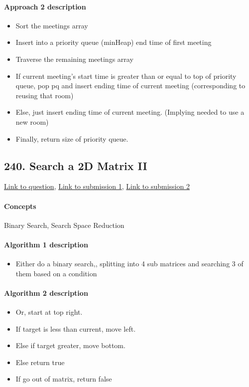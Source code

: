 \documentclass[11pt]{book}
\begin{document}
\paragraph{Approach 2 description}
\begin{itemize}
    \item Sort the meetings array
    \item Insert into a priority queue (minHeap) end time of first meeting
    \item Traverse the remaining meetings array
    \item If current meeting's start time is greater than or equal to top of priority queue, pop pq and insert ending time of current meeting (corresponding to reusing that room)
    \item Else, just insert ending time of current meeting. (Implying needed to use a new room)
    \item Finally, return size of priority queue.
\end{itemize}

\subsection{240. Search a 2D Matrix II}
\href{https://leetcode.com/problems/search-a-2d-matrix-ii/}{Link to question},
\href{https://leetcode.com/submissions/detail/340382596/}{Link to submission 1},
\href{https://leetcode.com/submissions/detail/340384118/}{Link to submission 2}
\paragraph{Concepts}
Binary Search, Search Space Reduction
\paragraph{Algorithm 1 description}
\begin{itemize}
    \item Either do a binary search,, splitting into 4 sub matrices and searching 3 of them based on a condition
\end{itemize}
\paragraph{Algorithm 2 description}
\begin{itemize}
    \item Or, start at top right.
    \item If target is less than current, move left.
    \item Else if target greater, move bottom.
    \item Else return true
    \item If go out of matrix, return false
\end{itemize}
\end{document}
